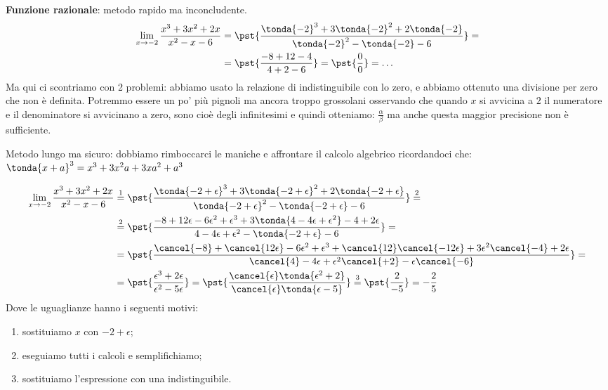 \begin{esempio}
\textbf{Funzione razionale}: metodo rapido ma inconcludente.
\begin{align*}
\lim_{x \rightarrow -2} \frac{x^3+3x^2+2x}{x^2-x-6} & = 
\pst{\frac
  {\tonda{-2}^3+3\tonda{-2}^2+2\tonda{-2}}
  {\tonda{-2}^2-\tonda{-2}-6}} =\\ 
  &=\pst{\frac{-8+12-4}
              {4+2-6}} = \pst{\frac{0}{0}} = \dots
\end{align*}
Ma qui ci scontriamo con 2 problemi: abbiamo usato la relazione di 
indistinguibile con lo zero, e abbiamo ottenuto una divisione per zero che 
non è definita. Potremmo essere un po' più pignoli ma ancora troppo 
grossolani osservando che quando \(x\) si avvicina a \(2\) il numeratore e 
il denominatore si avvicinano a zero, sono cioè degli infinitesimi e quindi 
otteniamo: \(\frac{\alpha}{\beta}\) ma anche questa maggior precisione non 
è sufficiente.

Metodo lungo ma sicuro:
dobbiamo rimboccarci le maniche e affrontare il calcolo algebrico 
ricordandoci che: \\
\(\tonda{x+a}^3= x^3+3x^2a+3xa^2+a^3\)

\begin{align*}
\lim_{x \rightarrow -2} \frac{x^3+3x^2+2x}{x^2-x-6} & \stackrel{1}{=} 
\pst{\frac
  {\tonda{-2+\epsilon}^3+3\tonda{-2+\epsilon}^2+2\tonda{-2+\epsilon}}
  {\tonda{-2+\epsilon}^2-\tonda{-2+\epsilon}-6}} \stackrel{2}{=}\\ 
  &\stackrel{2}{=}\pst{\frac{-8+12\epsilon-6\epsilon^2+\epsilon^3+
             3\tonda{4-4\epsilon+\epsilon^2}-4+2\epsilon}
             {4-4\epsilon+\epsilon^2-\tonda{-2+\epsilon}-6}} =\\ 
  &=\pst{\frac{\cancel{-8}+\cancel{12\epsilon}-6\epsilon^2+\epsilon^3+
          \cancel{12}\cancel{-12\epsilon}+3\epsilon^2\cancel{-4}+2\epsilon}
             {\cancel{4}-4\epsilon+
              \epsilon^2\cancel{+2}-\epsilon\cancel{-6}}}=\\ 
  &=\pst{\frac{\epsilon^3+2\epsilon}{\epsilon^2-5\epsilon}} = 
    \pst{\frac{\cancel{\epsilon} \tonda{\epsilon^2+2}}
             {\cancel{\epsilon} \tonda{\epsilon-5}}}  \stackrel{3}{=} 
    \pst{\frac{2}{-5}} = -\frac{2}{5}
\end{align*}
Dove le uguaglianze hanno i seguenti motivi:
\begin{enumerate} [nosep]
 \item sostituiamo \(x\) con \(-2+\epsilon\);
 \item eseguiamo tutti i calcoli e semplifichiamo;
 \item sostituiamo l'espressione con una indistinguibile.
\end{enumerate}
\end{esempio}

